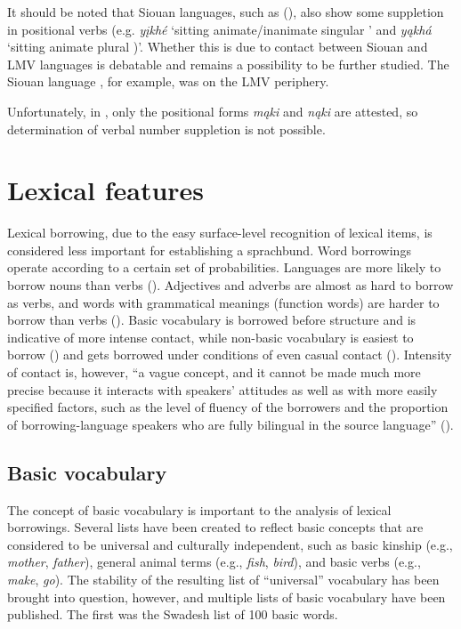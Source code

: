 \documentclass[output=paper]{LSP/langsci}
\begin{document}
	It should be noted that  Siouan languages, such as  (), also show some suppletion in positional verbs (e.g.  \emph{yįkhé} `sitting animate/inanimate singular ' and \emph{yąkhá} `sitting animate plural )'. Whether this is due to contact between  Siouan and LMV languages is debatable and remains a possibility to be further studied. The  Siouan language , for example, was on the LMV periphery.

Unfortunately, in , only the positional forms \emph{mąki} and \emph{nąki} are attested, so determination of verbal number suppletion is not possible.

\section{Lexical features}

	Lexical borrowing, due to the easy surface-level recognition of lexical items, is considered less important for establishing a sprachbund. Word borrowings operate according to a certain set of probabilities. Languages are more likely to borrow nouns than verbs (\citealt[231]{Tadmoretal2010}). Adjectives and adverbs are almost as hard to borrow as verbs, and words with grammatical meanings (function words) are harder to borrow than verbs (\citealt[231]{Tadmoretal2010}). Basic vocabulary is borrowed before structure and is indicative of more intense contact, while non-basic vocabulary is easiest to borrow (\citealt[69]{Thomason2001}) and gets borrowed under conditions of even casual contact (\citealt[231]{Tadmoretal2010}). Intensity of contact is, however, “a vague concept, and it cannot be made much more precise because it interacts with speakers’ attitudes as well as with more easily specified factors, such as the level of fluency of the borrowers and the proportion of borrowing-language speakers who are fully bilingual in the source language” (\citealt[231]{Tadmoretal2010}). 

\subsection{Basic vocabulary}

	The concept of basic vocabulary is important to the analysis of lexical borrowings. Several lists have been created to reflect basic concepts that are considered to be universal and culturally independent, such as basic kinship (e.g., \emph{mother}, \emph{father}), general animal terms (e.g., \emph{fish}, \emph{bird}), and basic verbs (e.g., \emph{make}, \emph{go}). The stability of the resulting list of “universal” vocabulary has been brought into question, however, and multiple lists of basic vocabulary have been published. The first was the Swadesh list of 100 basic words.
\end{document}
